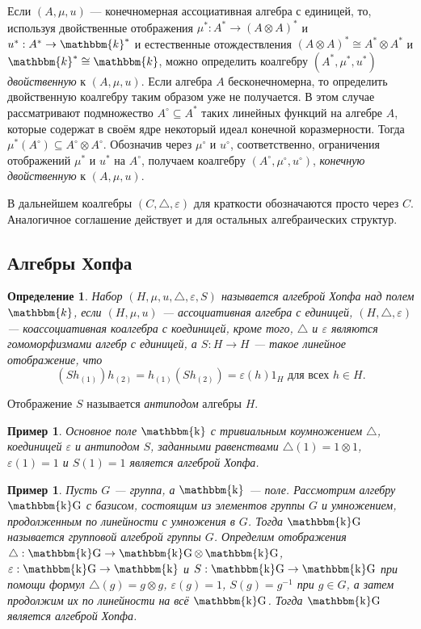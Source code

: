 \documentclass[12pt, reqno, a4paper, oneside, notitlepage]{amsart}
\theoremstyle{mytheoremstyle}
\theoremstyle{myremarkstyle}
\newtheorem{example}[theorem]{Пример}
\newtheorem{definition}[theorem]{Определение}
\numberwithin{equation}{section}
\DeclareMathOperator{\fld}{\mathbbm{k}}
\DeclareMathOperator{\kG}{\mathbbm{k}G}
\begin{document}
Если $(A, \mu, u)$ --- конечномерная ассоциативная алгебра с единицей, то, 
используя двойственные отображения $\mu^*: A^* \to \left(A \otimes A\right)^*$ и $u^*: A^* \to \mathbbm{k}^*$ и 
естественные отождествления $\left(A \otimes A\right)^* \cong A^* \otimes A^*$ и $\mathbbm{k}^* \cong \mathbbm{k}$, 
можно определить коалгебру $(A^*, \mu^*, u^*)$ \textit{двойственную} к $(A, \mu, u)$. 
Если алгебра $A$ бесконечномерна, то определить двойственную коалгебру таким образом уже не получается. 
В этом случае рассматривают подмножество $A^\circ \subseteq A^*$ таких линейных функций на алгебре $A$, которые содержат в своём ядре некоторый идеал конечной коразмерности. 
Тогда $\mu^*\left(A^\circ\right) \subseteq A^\circ \otimes A^\circ$. Обозначив через $\mu^\circ$ и $u^\circ$, 
соответственно, ограничения отображений $\mu^*$ и $u^*$ на $A^\circ$, получаем коалгебру $(A^\circ, \mu^\circ, u^\circ)$, \textit{конечную двойственную} к $(A, \mu, u)$.

В дальнейшем коалгебры $(C, \triangle, \varepsilon)$ для краткости обозначаются просто через $C$. Аналогичное соглашение действует и для остальных алгебраических структур.

\subsection{Алгебры Хопфа}

\begin{definition} \label{Hopf algebra}
  Набор $(H, \mu, u, \triangle, \varepsilon, S)$ называется \textit{алгеброй Хопфа} над полем $\mathbbm{k}$, если $(H, \mu, u)$ --- ассоциативная алгебра с единицей, 
  $(H, \triangle, \varepsilon)$ --- коассоциативная коалгебра с коединицей, 
  кроме того, $\triangle$ и $\varepsilon$ являются гомоморфизмами алгебр с единицей, а $S: H \to H$ --- такое линейное отображение, что \[
	\left(Sh_{(1)}\right)h_{(2)} = h_{(1)}\left(Sh_{(2)}\right) = \varepsilon(h)1_H \text{ для всех } h \in H.
  \]
\end{definition}

Отображение $S$ называется \textit{антиподом} алгебры $H$.

\begin{example} \label{field}
  Основное поле $\fld$ с тривиальным коумножением $\triangle$, коединицей $\varepsilon$ и антиподом $S$, заданными равенствами $\triangle(1) = 1 \otimes 1$,
  $\varepsilon(1) = 1$ и $S(1) = 1$ является алгеброй Хопфа.
\end{example}

\begin{example} \label{kG}
  Пусть $G$ --- группа, а $\fld$ --- поле. Рассмотрим алгебру $\kG$ с базисом, состоящим из элементов группы $G$ и умножением, продолженным по линейности с умножения в $G$. 
  Тогда $\kG$ называется \textit{групповой алгеброй} группы $G$. 
  Определим отображения $\triangle: \kG \to \kG \otimes \kG$, $\varepsilon: \kG \to \fld$ и $S: \kG \to \kG$ при помощи 
  формул $\triangle(g) = g \otimes g$, $\varepsilon(g) = 1$, $S(g) = g^{-1}$ при $g \in G$, а затем продолжим их по линейности на всё $\kG$. Тогда $\kG$ является алгеброй Хопфа.\end{example}
\end{document}
